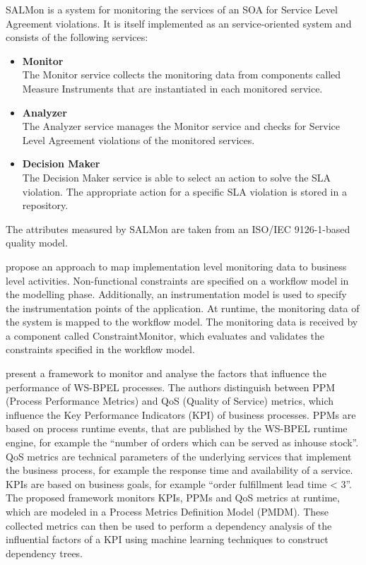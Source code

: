 SALMon \citep{Ameller:2008zr} is a system for monitoring the services of an SOA for Service Level Agreement violations. It is itself implemented as an service-oriented system and consists of the following services:
\begin{itemize}
	\item \textbf{Monitor}\\
	The Monitor service collects the monitoring data from components called Measure Instruments that are instantiated in each monitored service. 
	\item \textbf{Analyzer}\\
	The Analyzer service manages the Monitor service and checks for Service Level Agreement violations of the monitored services.
	\item \textbf{Decision Maker}\\
	The Decision Maker service is able to select an action to solve the SLA violation. The appropriate action for a specific SLA violation is stored in a repository.
\end{itemize}
The attributes measured by SALMon are taken from an ISO/IEC 9126-1-based quality model.

\citet{Textor:2009vn} propose an approach to map implementation level monitoring data to business level activities. Non-functional constraints are specified on a workflow model in the modelling phase. Additionally, an instrumentation model is used to specify the instrumentation points of the application. At runtime, the monitoring data of the system is mapped to the workflow model. 
The monitoring data is received by a component called ConstraintMonitor, which evaluates and validates the constraints specified in the workflow model.

\citet{Wetzstein:2009uq} present a framework to monitor and analyse the factors that influence the performance of WS-BPEL processes. The authors distinguish between PPM (Process Performance Metrics) and QoS (Quality of Service) metrics, which influence the Key Performance Indicators (KPI) of business processes. PPMs are based on process runtime events, that are published by the WS-BPEL runtime engine, for example the ``number of orders which can be served as inhouse stock''. QoS metrics are technical parameters of the underlying services that implement the business process, for example the response time and availability of a service. KPIs are based on business goals, for example ``order fulfillment lead time < 3''. The proposed framework monitors KPIs, PPMs and QoS metrics at runtime, which are modeled in a Process Metrics Definition Model (PMDM). These collected metrics can then be used to perform a dependency analysis of the influential factors of a KPI using machine learning techniques to construct dependency trees.

